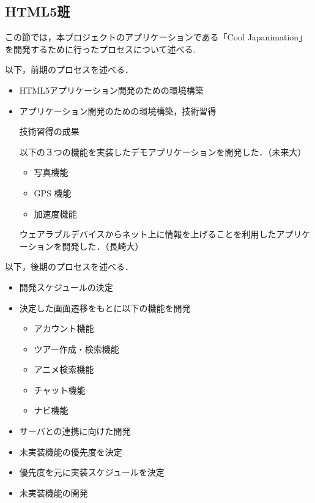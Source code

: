 \subsection{HTML5班}
\par この節では，本プロジェクトのアプリケーションである「Cool Japanimation」を開発するために行ったプロセスについて述べる.

\par 以下，前期のプロセスを述べる．

\begin{itemize}
\item HTML5アプリケーション開発のための環境構築
\item アプリケーション開発のための環境構築，技術習得

\par 技術習得の成果

\par 以下の３つの機能を実装したデモアプリケーションを開発した．（未来大）
\begin{itemize}
\item 写真機能
\item GPS 機能
\item 加速度機能
\end{itemize}

\par ウェアラブルデバイスからネット上に情報を上げることを利用したアプリケーションを開発した．（長崎大）
\end{itemize}
\par
\par 以下，後期のプロセスを述べる．
\begin{itemize}
\item 開発スケジュールの決定
\item 決定した画面遷移をもとに以下の機能を開発
\begin{itemize}
\item アカウント機能
\item ツアー作成・検索機能
\item アニメ検索機能
\item チャット機能
\item ナビ機能
\end{itemize}
\item サーバとの連携に向けた開発
\item 未実装機能の優先度を決定
\item 優先度を元に実装スケジュールを決定
\item 未実装機能の開発
\end{itemize}

